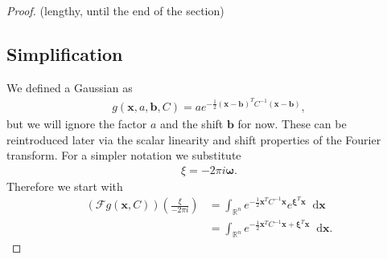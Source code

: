 \documentclass{paper}
\newcommand{\F}{\ensuremath{\mathcal{F}}}
\newcommand{\vr}[1]{\ensuremath{\boldsymbol{#1}}}
\newcommand*\diff{\mathop{}\!\mathrm{d}}
\newcommand{\omegavec}[0]{\ensuremath{\vr{\omega{}}}}
\begin{document}
\begin{proof} (lengthy, until the end of the section)
\subsection*{Simplification}
We defined a Gaussian as 
\begin{align*}
	g(\vr{x}, a, \vr{b}, C) = a e^{-\frac{1}{2}(\vr{x}-\vr{b})^T C^{-1}(\vr{x}-\vr{b})},
\end{align*}
but we will ignore the factor $a$ and the shift $\vr{b}$ for now.
These can be reintroduced later via the scalar linearity and shift properties of the Fourier transform.
For a simpler notation we substitute
\begin{align*}
	\xi = -2 \pi i \omegavec.
\end{align*}
Therefore we start with
\begin{align*}
	(\F g(\vr{x}, C))(\frac{\xi}{-2 \pi i}) &= \int_{\mathbb{R}^n} e^{-\frac{1}{2} \vr{x}^T C^{-1} \vr{x}} e^{\vr{\xi}^T \vr{x}} \diff \vr{x} \\
	&= \int_{\mathbb{R}^n} e^{-\frac{1}{2} \vr{x}^T C^{-1} \vr{x} + \vr{\xi}^T \vr{x}} \diff \vr{x}.
\end{align*}


\end{proof}
\end{document}
